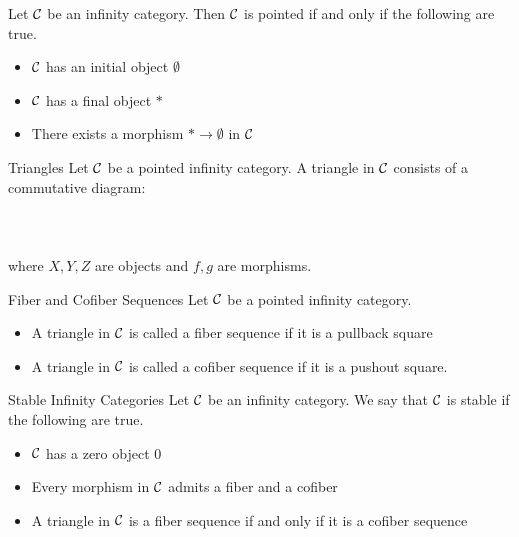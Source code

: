 \documentclass[a4paper]{article}
\begin{document}
\begin{lmm}{}{} Let $\mathcal{C}$ be an infinity category. Then $\mathcal{C}$ is pointed if and only if the following are true. 
\begin{itemize}
\item $\mathcal{C}$ has an initial object $\emptyset$
\item $\mathcal{C}$ has a final object $\ast$
\item There exists a morphism $\ast\to\emptyset$ in $\mathcal{C}$
\end{itemize}
\end{lmm}

\begin{defn}{Triangles}{} Let $\mathcal{C}$ be a pointed infinity category. A triangle in $\mathcal{C}$ consists of a commutative diagram: \\~\\
\\~\\
where $X,Y,Z$ are objects and $f,g$ are morphisms. 
\end{defn}

\begin{defn}{Fiber and Cofiber Sequences}{} Let $\mathcal{C}$ be a pointed infinity category. 
\begin{itemize}
\item A triangle in $\mathcal{C}$ is called a fiber sequence if it is a pullback square
\item A triangle in $\mathcal{C}$ is called a cofiber sequence if it is a pushout square. 
\end{itemize}
\end{defn}

\begin{defn}{Stable Infinity Categories}{} Let $\mathcal{C}$ be an infinity category. We say that $\mathcal{C}$ is stable if the following are true. 
\begin{itemize}
\item $\mathcal{C}$ has a zero object $0$
\item Every morphism in $\mathcal{C}$ admits a fiber and a cofiber
\item A triangle in $\mathcal{C}$ is a fiber sequence if and only if it is a cofiber sequence
\end{itemize}
\end{defn}
\end{document}
